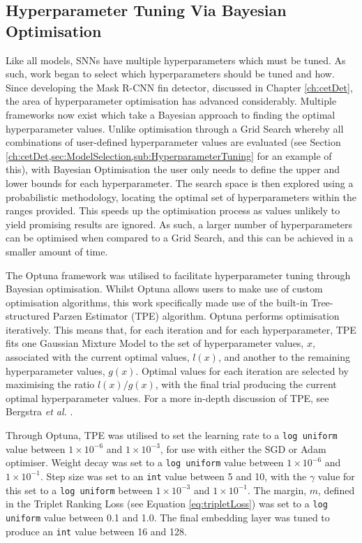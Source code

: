 \subsection{Hyperparameter Tuning Via Bayesian Optimisation }\label{ch:ID,sec:SNNDevelopment,sub:Optuna}

Like all models, SNNs have multiple hyperparameters which must be tuned. As such, work began to select which hyperparameters should be tuned and how. Since developing the Mask R-CNN fin detector, discussed in Chapter \ref{ch:cetDet}, the area of hyperparameter optimisation has advanced considerably. Multiple frameworks now exist which take a Bayesian approach to finding the optimal hyperparameter values. Unlike optimisation through a Grid Search whereby all combinations of user-defined hyperparameter values are evaluated (see Section \ref{ch:cetDet,sec:ModelSelection,sub:HyperparameterTuning} for an example of this), with Bayesian Optimisation the user only needs to define the upper and lower bounds for each hyperparameter. The search space is then explored using a probabilistic methodology, locating the optimal set of hyperparameters within the ranges provided. This speeds up the optimisation process as values unlikely to yield promising results are ignored. As such, a larger number of hyperparameters can be optimised when compared to a Grid Search, and this can be achieved in a smaller amount of time. 

The Optuna framework \cite{akiba_optuna_2019}  was utilised to facilitate hyperparameter tuning through Bayesian optimisation. Whilst Optuna allows users to make use of custom optimisation algorithms, this work specifically made use of the built-in Tree-structured Parzen Estimator (TPE)	 algorithm. Optuna performs optimisation iteratively. This means that, for each iteration and for each hyperparameter, TPE fits one Gaussian Mixture Model to the set of hyperparameter values, $x$, associated with the current optimal values, $l(x)$, and another to the remaining hyperparameter values, $g(x)$. Optimal values for each iteration are selected by maximising the ratio $l(x)/g(x)$, with the final trial producing the current optimal hyperparameter values. For a more in-depth discussion of TPE, see Bergstra \textit{et al.} \cite{bergstra_algorithms_2011}.

Through Optuna, TPE was utilised to set the learning rate to a \texttt{log uniform} value between $1\times10^{-6}$ and $1\times10^{-3}$, for use with either the SGD or Adam optimiser.  Weight decay was set to a \texttt{log uniform} value between $1\times10^{-6}$ and $1\times10^{-1}$. Step size was set to an \texttt{int} value between 5 and 10, with the $\gamma$ value for this set to a \texttt{log uniform} between $1\times10^{-3}$ and $1\times10^{-1}$. The margin, $m$, defined in the Triplet Ranking Loss (see Equation \ref{eq:tripletLoss}) was set to a \texttt{log uniform} value between 0.1 and 1.0. The final embedding layer was tuned to produce an \texttt{int} value between 16 and 128.

